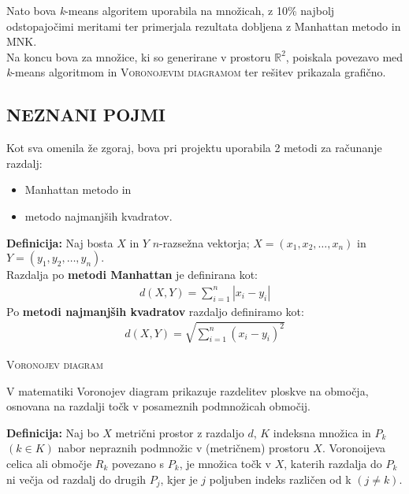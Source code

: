 \documentclass[11pt, a4paper]{article}
\begin{document}
\noindent Nato bova \textsl{k}-means algoritem uporabila na množicah, z 10\% najbolj odstopajočimi meritami ter primerjala rezultata dobljena z Manhattan metodo in MNK. \\

\noindent Na koncu bova za množice, ki so generirane v prostoru $\mathbb{R}^2$, poiskala povezavo med \textsl{k}-means algoritmom in \textsc{Voronojevim diagramom} ter rešitev prikazala grafično.

\subsection{\textbf{NEZNANI POJMI}}

\noindent Kot sva omenila že zgoraj, bova pri projektu uporabila 2 metodi za računanje razdalj:
\begin{itemize}
	\item Manhattan metodo in
	\item metodo najmanjših kvadratov.
\end{itemize}

\newpage

\noindent \textbf{Definicija:} Naj bosta $X$ in $Y$ $n$-razsežna vektorja; $X = (x_1, x_2, \ldots, x_n)$ in $Y = (y_1, y_2,\ldots, y_n).$ \\
\noindent Razdalja po \textbf{metodi Manhattan} je definirana kot: 
\begin{align*}
d(X, Y) = \sum_{i = 1}^n | x_i - y_i |
\end{align*}
\noindent Po \textbf{metodi najmanjših kvadratov} razdaljo definiramo kot:
\begin{align*}
d(X, Y) = \sqrt {\sum_{i = 1}^n (x_i - y_i)^2}
\end{align*}

\noindent \textsc{Voronojev diagram}

\noindent V matematiki Voronojev diagram prikazuje razdelitev ploskve na območja, osnovana na razdalji točk v posameznih podmnožicah območij. 

\vspace{0,5 cm}

\noindent \textbf{Definicija:} Naj bo $X$ metrični prostor z razdaljo $d$, $K$ indeksna množica in $P_k$ $(k \in K)$ nabor nepraznih podmnožic v (metričnem) prostoru $X$. Voronoijeva celica ali območje $R_k$ povezano s $P_k$, je množica točk v $X$, katerih razdalja do $P_k$ ni večja od razdalj do drugih $P_j$, kjer je $j$ poljuben indeks različen od k $(j \neq k)$. \\
\end{document}
